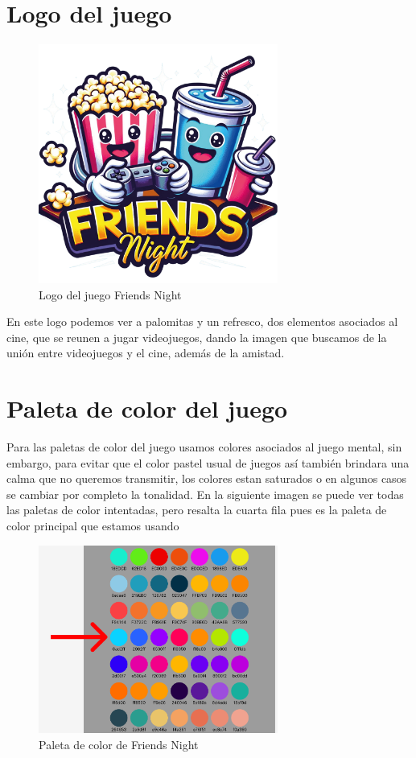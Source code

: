 \documentclass[12pt, oneside, letterpaper]{book}
\begin{document}
\section{Logo del juego}
\begin{figure}[h]
\includegraphics[width=0.7\textwidth]{logofriends.png}%
\caption{Logo del juego Friends Night}%
\label{LFN}%
\end{figure}
\p En este logo podemos ver a palomitas y un refresco, dos elementos asociados al cine, que se reunen a jugar videojuegos, dando la imagen que buscamos de la unión entre videojuegos y el cine, además de la amistad. 

\section{Paleta de color del juego}
\p Para las paletas de color del juego usamos colores asociados al juego mental, sin embargo, para evitar que el color pastel usual de juegos así también brindara una calma que no queremos transmitir, los colores estan saturados o en algunos casos se cambiar por completo la tonalidad. 
En la siguiente imagen se puede ver todas las paletas de color intentadas, pero resalta la cuarta fila pues es la paleta de color principal que estamos usando 
\begin{figure}[h]
\includegraphics[width=0.7\textwidth]{PaletaDeColorFN.png}%
\caption{Paleta de color de Friends Night}%
\label{PCFN}%
\end{figure}
\end{document}
